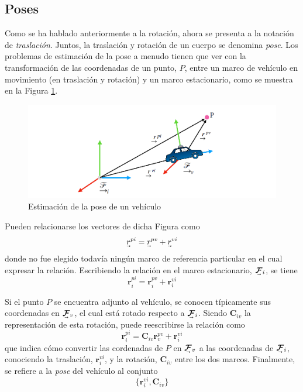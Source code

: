 

\subsection{Poses}
Como se ha hablado anteriormente a la rotación, ahora se presenta a la notación de \textit{traslación}. Juntos, la traslación y rotación de un cuerpo se denomina \textit{pose}. Los problemas de estimación de la pose a menudo tienen que ver con la transformación de las coordenadas de un punto, $P$, entre un marco de vehículo en movimiento (en traslación y rotación) y un marco estacionario, como se muestra en la Figura \ref{fig:pose}.
\begin{figure}[!b]
    \centering
    \includegraphics[width=\textwidth]{Img/Pose.png}
    \caption{Estimación de la pose de un vehículo}
    \label{fig:pose}
\end{figure}

Pueden relacionarse los vectores de dicha Figura como
\begin{equation}
    \undervec{r}^{pi} = \undervec{r}^{pv}+\undervec{r}^{vi}
\end{equation}
donde no fue elegido todavía ningún marco de referencia particular en el cual expresar la relación. Escribiendo la relación en el marco estacionario, $\undervec{\bm{\mathcal{F}}}_i$, se tiene
\begin{equation}
    \bm{r}_i^{pi} = \bm{r}_i^{pv} + \bm{r}_i^{vi}
\end{equation}

Si el punto $P$ se encuentra adjunto al vehículo, se conocen típicamente sus coordenadas en $\undervec{\bm{\mathcal{F}}}_v$, el cual está rotado respecto a $\undervec{\bm{\mathcal{F}}}_i$. Siendo $\bm{C}_{iv}$ la representación de esta rotación, puede reescribirse la relación como
\begin{equation}
    \bm{r}_i^{pi} = \bm{C}_{iv}\bm{r}_v^{pv} + \bm{r}_i^{vi}
    \label{eq:poseconvertion}
\end{equation}
que indica cómo convertir las cordenadas de $P$ en $\undervec{\bm{\mathcal{F}}}_v$ a las coordenadas de $\undervec{\bm{\mathcal{F}}}_i$, conociendo la traslación, $\bm{r}_i^{vi}$, y la rotación, $\bm{C}_{iv}$ entre los dos marcos. Finalmente, se refiere a la \textit{pose} del vehículo al conjunto
\begin{equation}
    \{\bm{r}_i^{vi},\bm{C}_{iv}\}
\end{equation}

